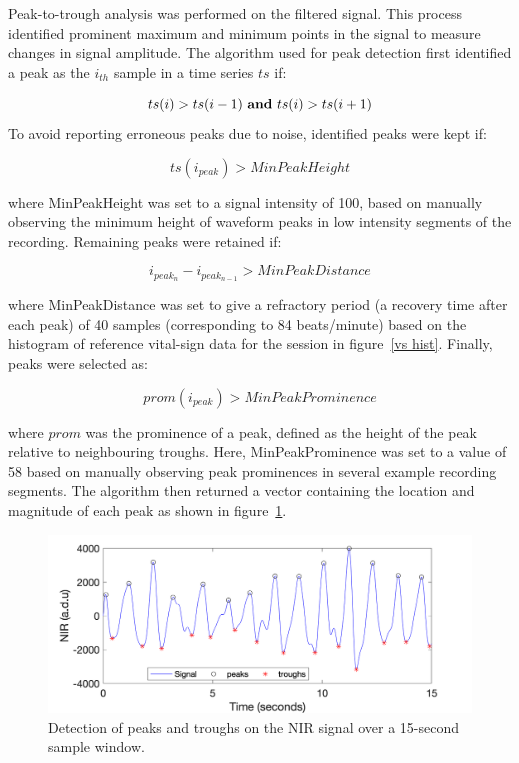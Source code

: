 Peak-to-trough analysis was performed on the filtered signal. This process identified prominent maximum and minimum points in the signal to measure changes in signal amplitude. The algorithm used for peak detection first identified a peak as the $i _{th}$ sample in a time series $ts$ if: 

\begin{equation}
	ts(i) > ts(i-1)\textrm{ \textbf{and} } ts(i) > ts(i+1)
\end{equation}
To avoid reporting erroneous peaks due to noise, identified peaks were kept if:

\begin{equation}
	ts(i_{peak})  > MinPeakHeight
\end{equation}

where MinPeakHeight was set to a signal intensity of 100, based on manually observing the minimum height of waveform peaks in low intensity segments of the recording. Remaining peaks were retained if:

\begin{equation}
	i_{peak_{n}} - i_{peak_{n-1}}  >  MinPeakDistance
\end{equation}

where MinPeakDistance was set to give a refractory period (a recovery time after each peak) of 40 samples (corresponding to 84 beats/minute) based on the histogram of reference vital-sign data for the session in figure~\ref{vs hist}. Finally, peaks were selected as:

\begin{equation}
	prom(i_{peak}) > MinPeakProminence
\end{equation}

where $prom$ was the prominence of a peak, defined as the height of the peak relative to neighbouring troughs. Here, MinPeakProminence was set to a value of 58 based on manually observing peak prominences in several example recording segments. The algorithm then returned a vector containing the location and magnitude of each peak as shown in figure~\ref{peak}.

\begin{figure}
\centering
\includegraphics[width = 10 cm]{./figures/peakdetector.png}
    \caption{Detection of peaks and troughs on the NIR signal over a 15-second sample window.}
  \label{peak}
\end{figure}

